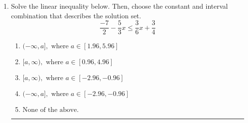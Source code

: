 \documentclass[14pt]{extbook}
\newcommand{\litem}[1]{\item#1\hspace*{-1cm}\rule{\textwidth}{0.4pt}}
\begin{document}
\begin{enumerate}
{\begin{enumerate}[label=\Alph*.]
\end{enumerate} }
\litem{
Solve the linear inequality below. Then, choose the constant and interval combination that describes the solution set.\[ \frac{-7}{2} - \frac{5}{3} x \leq \frac{3}{6} x + \frac{3}{4} \]\begin{enumerate}[label=\Alph*.]
\item \( (-\infty, a], \text{ where } a \in [1.96, 5.96] \)
\item \( [a, \infty), \text{ where } a \in [0.96, 4.96] \)
\item \( [a, \infty), \text{ where } a \in [-2.96, -0.96] \)
\item \( (-\infty, a], \text{ where } a \in [-2.96, -0.96] \)
\item \( \text{None of the above}. \)

\end{enumerate} }
\end{enumerate}
\end{document}

